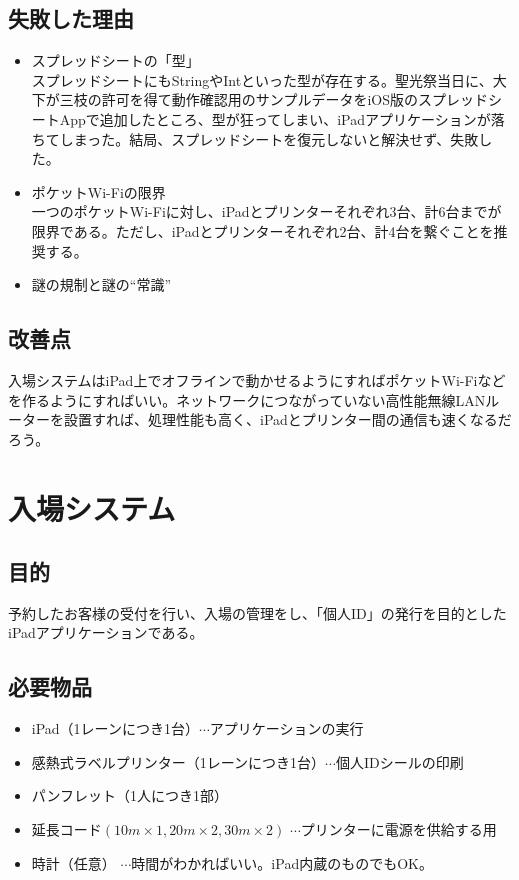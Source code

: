 \documentclass[a4paper]{ltjsreport}
\begin{document}
\subsection{失敗した理由}
\begin{itemize}
  \item スプレッドシートの「型」\\
        スプレッドシートにもStringやIntといった型が存在する。聖光祭当日に、大下が三枝の許可を得て動作確認用のサンプルデータをiOS版のスプレッドシートAppで追加したところ、型が狂ってしまい、iPadアプリケーションが落ちてしまった。結局、スプレッドシートを復元しないと解決せず、失敗した。
  \item ポケットWi-Fiの限界\\
        一つのポケットWi-Fiに対し、iPadとプリンターそれぞれ3台、計6台までが限界である。ただし、iPadとプリンターそれぞれ2台、計4台を繋ぐことを推奨する。
  \item 謎の規制と謎の``常識''
\end{itemize}

\subsection{改善点}
入場システムはiPad上でオフラインで動かせるようにすればポケットWi-Fiなどを作るようにすればいい。ネットワークにつながっていない高性能無線LANルーターを設置すれば、処理性能も高く、iPadとプリンター間の通信も速くなるだろう。
\section{入場システム}
\subsection{目的}
予約したお客様の受付を行い、入場の管理をし、「個人ID」の発行を目的としたiPadアプリケーションである。
\subsection{必要物品}
\begin{itemize}
  \item iPad（1レーンにつき1台）$\cdots$アプリケーションの実行
  \item 感熱式ラベルプリンター（1レーンにつき1台）$\cdots$個人IDシールの印刷
  \item パンフレット（1人につき1部）
  \item 延長コード$(10m\times1,20m\times2,30m\times2)$ $\cdots$プリンターに電源を供給する用
  \item 時計（任意） $\cdots$時間がわかればいい。iPad内蔵のものでもOK。
\end{itemize}
\end{document}
